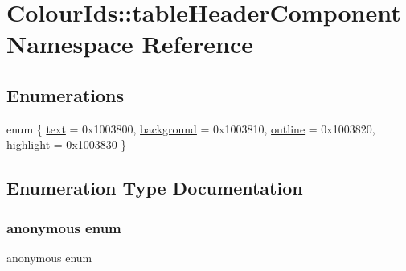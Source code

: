 \hypertarget{namespaceColourIds_1_1tableHeaderComponent}{}\section{Colour\+Ids\+:\+:table\+Header\+Component Namespace Reference}
\label{namespaceColourIds_1_1tableHeaderComponent}
\subsection*{Enumerations}
\begin{DoxyCompactItemize}
\item 
enum \{ \mbox{\hyperlink{namespaceColourIds_1_1tableHeaderComponent_af615a9993cdea52559919a0671c0182ba6df033aa095aa58e5c09bf69b9dcbb65}{text}} = 0x1003800, 
\mbox{\hyperlink{namespaceColourIds_1_1tableHeaderComponent_af615a9993cdea52559919a0671c0182babca94d9559c6c7ff2e1bbdddab61226b}{background}} = 0x1003810, 
\mbox{\hyperlink{namespaceColourIds_1_1tableHeaderComponent_af615a9993cdea52559919a0671c0182ba0c07c457b893f4625ce75412fe91335e}{outline}} = 0x1003820, 
\mbox{\hyperlink{namespaceColourIds_1_1tableHeaderComponent_af615a9993cdea52559919a0671c0182bac8895562f8b10648ecb85f8f69ac7347}{highlight}} = 0x1003830
 \}
\end{DoxyCompactItemize}


\subsection{Enumeration Type Documentation}
\mbox{\label{namespaceColourIds_1_1tableHeaderComponent_af615a9993cdea52559919a0671c0182b}} 
\subsubsection{\texorpdfstring{anonymous enum}{anonymous enum}}
{\footnotesize\ttfamily anonymous enum}


